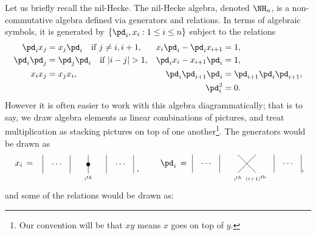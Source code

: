 \documentclass[11pt,reqno]{amsart}
\renewcommand{\te}[1]{\textrm{#1}}
\begin{document}
Let us briefly recall the nil-Hecke. The nil-Hecke algebra, denoted $\NH_n$, is a non-commutative algebra defined via generators and relations. In terms of algebraic symbols, it is generated by $\{\pd_i,x_i:1\le i\le n\}$ subject to the relations
\begin{align*}
    \pd_i x_j &= x_j\pd_i \quad \text{if $j\neq i,i+1$}, & x_i \pd_i - \pd_i x_{i+1}&=1,\\
    \pd_i\pd_j &= \pd_j\pd_i \quad \text{if $|i-j|>1$}, & \pd_i x_i - x_{i+1} \pd_i &=1,\\
    x_i x_j &=   x_j x_i, & \pd_i\pd_{i+1}\pd_i &= \pd_{i+1}\pd_i\pd_{i+1},\\
     & &\pd_i^2&= 0.
\end{align*}
However it is often easier to work with this algebra diagrammatically; that is to say, we draw algebra elements as linear combinations of pictures, and treat multiplication as stacking pictures on top of one another\footnote{Our convention will be that $xy$ means $x$ goes on top of $y$.}. The generators would be drawn as
\[ \hackcenter{\begin{tikzpicture}[scale=0.375]
        \node at (-2,1) {$x_i \, = \, $}; 
        \draw (0,0)--(0,2);
        \node at (1.6,1) { $\cdots$};
        \draw (3,0)--(3,2);
        \draw (5,0)--(5,2);
        \draw(7,0)--(7,2);
        \node at (8.6,1) {$\cdots$};
        \draw (10,0)--(10,2);
        \fill (5,1) circle (6pt);
        \node at (5,-0.5) {\tiny $i^\te{th}$};
    \end{tikzpicture}}\ ,\qquad %
    \hackcenter{\begin{tikzpicture}[scale=0.375]
      \node at (-2,1) {$\pd_i \, = \, $};
        \draw (0,0)--(0,2);
       \node at (1.6,1) { $\cdots$};
        \draw (3,0)--(3,2);
        \draw (5,0)--(7,2);
        \node at (5,-0.6) {\tiny $i^\te{th}$};
        \draw(7,0)--(5,2);
        \node at (7,-0.6) {\tiny $(i\!+\!1)^\te{th}$};
        \draw(9,0)--(9,2);
        \node at (10.6,1) {$\cdots$};
        \draw (12,0)--(12,2);
    \end{tikzpicture}},\]
and some of the relations would be drawn as:
\end{document}
